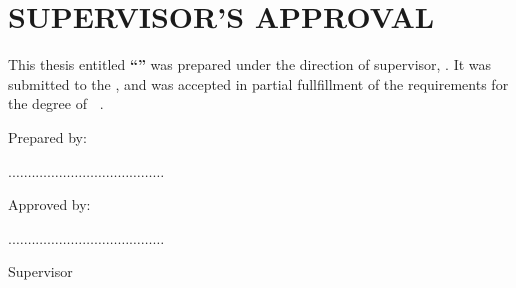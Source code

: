 \chapter{SUPERVISOR'S APPROVAL}

\makeatletter
This thesis entitled \textbf{``{\@title}''} was prepared under the direction of supervisor, {\@supervisor}. It was submitted to the {\@faculty}, and was accepted in partial fullfillment of the requirements for the degree of \textbf{\@programme~\@programmeT}.\par
\vspace{2cm}\par
\noindent Prepared by:\par
\vspace{2cm}\par
\noindent.$\dots\dots\dots\dots\dots\dots\dots\dots\dots\dots\dots\dots\dots$\par
\noindent{\@author}\par
\noindent{\@studentid}\par
\vspace{1cm}\par
\noindent Approved by:\par
\vspace{2cm}\par
\noindent.$\dots\dots\dots\dots\dots\dots\dots\dots\dots\dots\dots\dots\dots$\par
\noindent{\@supervisor}\par
\noindent Supervisor\par
\vspace{1cm}
\noindent\@datesubmit 
\makeatother
